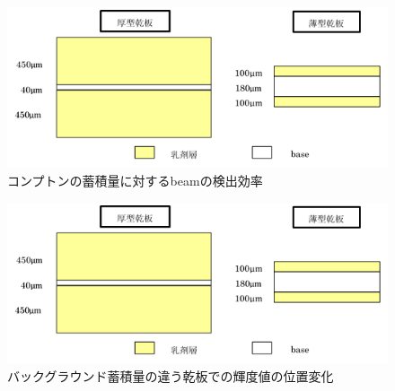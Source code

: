 \documentclass[12pt,a4paper]{jarticle}
\begin{document}
\begin{figure}[htbp]
    \begin{center}
     \includegraphics[width=140mm]{emulsionorder.png}
    \end{center}
    \caption{コンプトンの蓄積量に対するbeamの検出効率\label{fig:beam_efficiency_to_compton}}
\end{figure}
\begin{figure}[htbp]
    \begin{center}
     \includegraphics[width=140mm]{emulsionorder.png}
    \end{center}
    \caption{バックグラウンド蓄積量の違う乾板での輝度値の位置変化\label{fig:britnese_in_some_emulsion}}
\end{figure}
\end{document}
